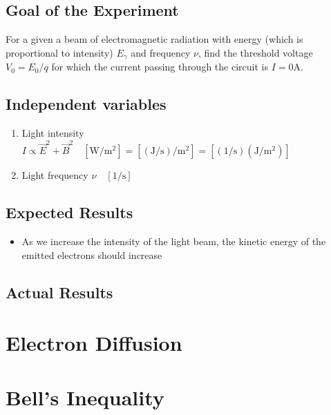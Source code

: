 \documentclass[a4paper]{article}
\begin{document}
\subsection*{Goal of the Experiment}
For a given a beam of electromagnetic radiation with energy (which is proportional to intensity) $E_\gamma$ and frequency $\nu$, find the threshold voltage $V_0=E_0/q$ for which the current passing through the circuit is $I=0 \mathrm{A}$.
\subsection*{Independent variables}
\begin{enumerate}
    \item Light intensity $I \propto \vec{E}^2 + \vec{B}^2 \quad [\mathrm{W/m^2}] = [\mathrm{(J/s)/m^2}]=[\mathrm{(1/s)(J/m^2)}]$
    \item Light frequency $\nu \quad [\mathrm{1/s}]$
\end{enumerate}
\subsection*{Expected Results} 
\begin{itemize}
    \item As we increase the intensity of the light beam, the kinetic energy of the emitted electrons should increase
\end{itemize}
\subsection*{Actual Results}
\section{Electron Diffusion}
\section{Bell's Inequality}
\end{document}
